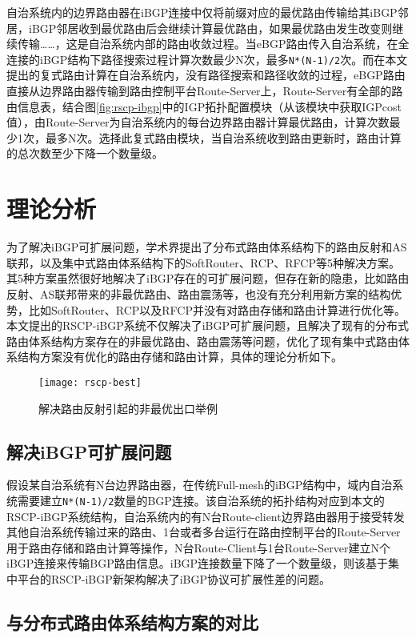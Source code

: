 自治系统内的边界路由器在iBGP连接中仅将前缀对应的最优路由传输给其iBGP邻居，iBGP邻居收到最优路由后会继续计算最优路由，如果最优路由发生改变则继续传输……，这是自治系统内部的路由收敛过程。当eBGP路由传入自治系统，在全连接的iBGP结构下路径搜索过程计算次数最少N次，最多\verb+N*(N-1)/2+次。而在本文提出的复式路由计算在自治系统内，没有路径搜索和路径收敛的过程，eBGP路由直接从边界路由器传输到路由控制平台Route-Server上，Route-Server有全部的路由信息表，结合图\ref{fig:rscp-ibgp}中的IGP拓扑配置模块（从该模块中获取IGPcost值），由Route-Server为自治系统内的每台边界路由器计算最优路由，计算次数最少1次，最多N次。选择此复式路由模块，当自治系统收到路由更新时，路由计算的总次数至少下降一个数量级。

\section{理论分析}

为了解决iBGP可扩展问题，学术界提出了分布式路由体系结构下的路由反射和AS联邦，以及集中式路由体系结构下的SoftRouter、RCP、RFCP等5种解决方案。其5种方案虽然很好地解决了iBGP存在的可扩展问题，但存在新的隐患，比如路由反射、AS联邦带来的非最优路由、路由震荡等，也没有充分利用新方案的结构优势，比如SoftRouter、RCP以及RFCP并没有对路由存储和路由计算进行优化等。本文提出的RSCP-iBGP系统不仅解决了iBGP可扩展问题，且解决了现有的分布式路由体系结构方案存在的非最优路由、路由震荡等问题，优化了现有集中式路由体系结构方案没有优化的路由存储和路由计算，具体的理论分析如下。

\begin{figure}
  \centering
  \texttt{[image: rscp-best]}
  \caption{解决路由反射引起的非最优出口举例}
  \label{fig:rscp-best}
\end{figure}


\subsection{解决iBGP可扩展问题}
假设某自治系统有N台边界路由器，在传统Full-mesh的iBGP结构中，域内自治系统需要建立\verb+N*(N-1)/2+数量的BGP连接。该自治系统的拓扑结构对应到本文的RSCP-iBGP系统结构，自治系统内的有N台Route-client边界路由器用于接受转发其他自治系统传输过来的路由、1台或者多台运行在路由控制平台的Route-Server用于路由存储和路由计算等操作，N台Route-Client与1台Route-Server建立N个iBGP连接来传输BGP路由信息。iBGP连接数量下降了一个数量级，则该基于集中平台的RSCP-iBGP新架构解决了iBGP协议可扩展性差的问题。

\subsection{与分布式路由体系结构方案的对比}

